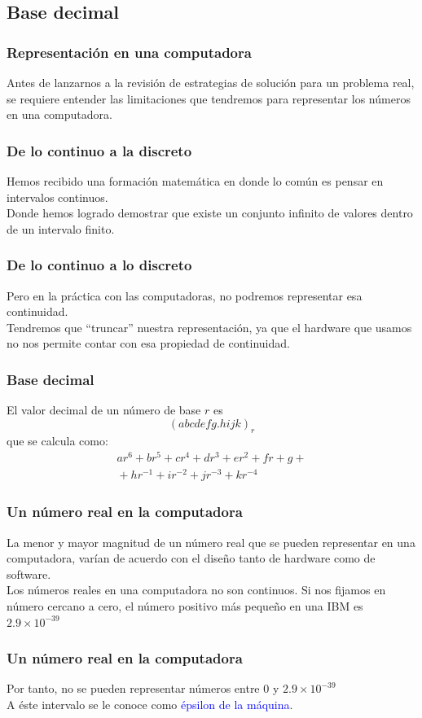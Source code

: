 \subsection{Base decimal}
\begin{frame}
\frametitle{Representación en una computadora}
Antes de lanzarnos a la revisión de estrategias de solución para un problema real, se requiere entender las limitaciones que tendremos para representar los números en una computadora.
\end{frame}
\begin{frame}
\frametitle{De lo continuo a la discreto}
Hemos recibido una formación matemática en donde lo común es pensar en intervalos continuos.
\\
\bigskip
\pause
Donde hemos logrado demostrar que existe un conjunto infinito de valores dentro de un intervalo finito.
\end{frame}
\begin{frame}
\frametitle{De lo continuo a lo discreto}
Pero en la práctica con las computadoras, no podremos representar esa continuidad.
\\
\bigskip
\pause
Tendremos que \enquote{truncar} nuestra representación, ya que el hardware que usamos no nos permite contar con esa propiedad de continuidad.
\end{frame}
\begin{frame}
\frametitle{Base decimal}
El valor decimal de un número de base $r$ es
\[(abcdefg.hijk)_{r}\]
que se calcula como:
\begin{eqnarray*}
ar^{6} + br^{5} + cr^{4} + dr^{3} + er^{2} + fr +
 g + {} \\
{} + hr^{-1} + ir^{-2} + jr^{-3} + kr^{-4}
\end{eqnarray*}
\end{frame}
\begin{frame}
\frametitle{Un número real en la computadora}
La menor y mayor magnitud de un número real que se pueden representar en una computadora, varían de acuerdo con el diseño tanto de hardware como de software.
\\
\bigskip
Los números reales en una computadora no son continuos. Si nos fijamos en número cercano a cero, el número positivo más pequeño en una IBM es $2.9 \times 10^{-39}$
\end{frame}
\begin{frame}
\frametitle{Un número real en la computadora}
Por tanto, no se pueden representar números entre $0$ y $2.9 \times 10^{-39}$ 
\\
\bigskip
A éste intervalo se le conoce como \textcolor{blue}{épsilon de la máquina}.
\end{frame}
